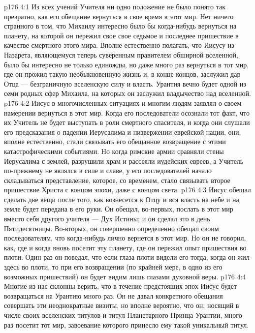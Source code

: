 \vs p176 4:1 Из всех учений Учителя ни одно положение не было понято так превратно, как его обещание вернуться в свое время в этот мир. Нет ничего странного в том, что Михаилу интересно было бы когда\hyp{}нибудь вернуться на планету, на которой он пережил свое свое седьмое и последнее пришествие в качестве смертного этого мира. Вполне естественно полагать, что Иисусу из Назарета, являющемуся теперь суверенным правителем обширной вселенной, было бы интересно не только единожды, но даже много раз вернуться в тот мир, где он прожил такую необыкновенную жизнь и, в конце концов, заслужил дар Отца --- безграничную вселенскую силу и власть. Урантия вечно будет одной из семи родных сфер Михаила, на которых он заслужил владычество над вселенной.
\vs p176 4:2 Иисус в многочисленных ситуациях и многим людям заявлял о своем намерении вернуться в этот мир. Когда его последователи осознали тот факт, что их Учитель не будет выступать в роли смертного спасителя, и когда они слушали его предсказания о падении Иерусалима и низвержении еврейской нации, они, вполне естественно, стали связывать его обещанное возвращение с этими катастрофическими событиями. Но когда римские армии сравняли стены Иерусалима с землей, разрушили храм и рассеяли иудейских евреев, а Учитель по\hyp{}прежнему не являлся в силе и славе, у его последователей начало складываться представление, которое, со временем, стало связывать второе пришествие Христа с концом эпохи, даже с концом света.
\vs p176 4:3 Иисус обещал сделать две вещи после того, как вознесется к Отцу и вся власть на небе и на земле будет передана в его руки. Он обещал, во\hyp{}первых, послать в этот мир вместо себя другого учителя --- Дух Истины; и он сделал это в день Пятидесятницы. Во\hyp{}вторых, он совершенно определенно обещал своим последователям, что когда\hyp{}нибудь лично вернется в этот мир. Но он не говорил, как, где и когда вновь посетит эту планету, где он пережил опыт пришествия во плоти. Один раз он поведал, что если глаза плоти видели его тогда, когда он жил здесь во плоти, то при его возвращении (по крайней мере, в одно из его возможных пришествий) он будет видим лишь глазами духовной веры.
\vs p176 4:4 Многие из нас склонны верить, что в течение предстоящих эпох Иисус будет возвращаться на Урантию много раз. Он не давал конкретного обещания совершать эти неоднократные визиты, но вполне вероятно, что он, носящий в числе своих вселенских титулов и титул Планетарного Принца Урантии, много раз посетит тот мир, завоевание которого принесло ему такой уникальный титул.
